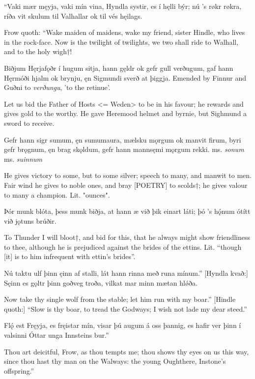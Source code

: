 “Vaki mær męyja, \hld vaki mín vina,
Hyndla systir, \hld es í hęlli býr;
nú ’s røkr røkra, \hld ríða vit skulum
til Valhallar \hld ok til vés hęilags.

Frow quoth:
“Wake maiden of maidens, wake my friend, sister Hindle, who lives in the rock-face. Now is the twilight of twilights, we two shall ride to Walhall, and to the holy wigh†!

Biðjum Hęrjafǫðr \hld í hugum sitja,
hann gęldr ok gefr \hld gull verðugum\footnotemark[1],
gaf hann Hęrmóði \hld hjalm ok brynju,
ęn Sigmundi \hld sverð at þiggja.
\footnotetext[1] Emended by Finnur and Guðni to \emph{verðungu}, 'to the retinue'.

Let us bid the Father of Hosts <= Weden> to be in his favour; he rewards and gives gold to the worthy. He gave Heremood helmet and byrnie, but Sighmund a sword to receive.

Gefr hann sigr sumum\footnotetext[1], \hld ęn sumum\footnotetext[2] aura,
mælsku mǫrgum \hld ok manvit firum,
byri gefr brǫgnum, \hld ęn brag skǫldum,
gefr hann mannsęmi \hld mǫrgum rekki.
\footnotetext[1] ms. \emph{sonum}
\footnotetext[2] ms. \emph{suinnum}

He gives victory to some, but to some silver\footnotemark[1]; speech to many, and manwit to men. Fair wind he gives to noble ones, and bray [POETRY] to scolds†; he gives valour to many a champion.
\footnotemark[1] Lit. "ounces".

Þór munk blóta, \hld þess munk biðja,
at hann æ við þik \hld einart láti;
þó ’s hǫ́num ótítt \hld við jǫtuns brúðir.

To Thunder I will bloot†, and bid for this, that he always might show friendliness to thee, although he is prejudiced against the brides of the ettins\footnotemark[1].
\footnotetext[1] Lit. “though [it] is to him infrequent with ettin's brides”.

Nú taktu ulf þinn \hld ęinn af stalli,
lát hann rinna \hld með runa mínum.”
[Hyndla kvað:] Sęinn es gǫltr þinn \hld goðveg troða,
vilkat mar minn \hld mætan hlǿða.

Now take thy single wolf from the stable; let him run with my boar.” [Hindle quoth:] “Slow is thy boar, to tread the Godways; I wish not lade my dear steed.”

Flǫ́ est Fręyja, \hld es fręistar mín,
visar þú augum \hld á oss þannig,
es hafir ver þinn \hld í valsinni
Óttar unga \hld Innsteins bur.”

Thou art deicitful, Frow, as thou tempts me; thou shows thy eyes on us this way, since thou hast thy man on the Walways: the young Oughthere, Instone's offspring.”

